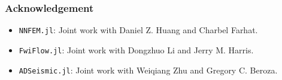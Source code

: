 \documentclass{beamer}
\begin{document}
\begin{frame}
	\frametitle{Acknowledgement}
	\begin{itemize}
		\item \texttt{NNFEM.jl}: Joint work with Daniel Z. Huang and Charbel Farhat.
		\item \texttt{FwiFlow.jl}: Joint work with Dongzhuo Li and Jerry M. Harris. 
		\item \texttt{ADSeismic.jl}: Joint work with Weiqiang Zhu and Gregory C. Beroza. 
	\end{itemize}
\end{frame}



\end{document}
